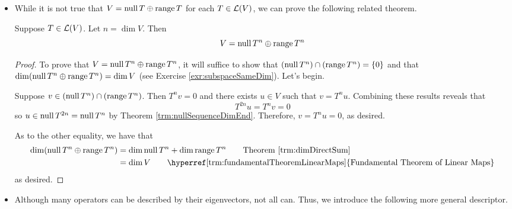 \documentclass[../main.tex]{subfiles}
\begin{document}
\begin{itemize}
\begin{theorem}
\begin{proof}
            At each of these strict inclusions, the dimension from the previous to the next null space must increase by at least one. Thus, $\dim\nul T^{n+1}\geq n+1$. But since $\nul T^{n+1}\subset V$, Theorem \ref{trm:dimSubspaces} asserts that $\dim\nul T^{n+1}\leq n$, so we have that
            \begin{equation*}
                n+1 \leq \dim\nul T^{n+1} \leq n
            \end{equation*}
            a contradiction.
        \end{proof}
    \end{theorem}
    \item While it is not true that $V=\operatorname{null} T\oplus\operatorname{range} T$ for each $T\in\mathcal{L}(V)$, we can prove the following related theorem.
    \begin{theorem}
        Suppose $T\in\mathcal{L}(V)$. Let $n=\dim V$. Then
        \begin{equation*}
            V = \operatorname{null} T^n\oplus\operatorname{range} T^n
        \end{equation*}
        \begin{proof}
            To prove that $V=\operatorname{null} T^n\oplus\operatorname{range} T^n$, it will suffice to show that $(\operatorname{null} T^n)\cap(\operatorname{range} T^n)=\{0\}$ and that $\dim(\operatorname{null} T^n\oplus\operatorname{range} T^n)=\dim V$ (see Exercise \ref{exr:subspaceSameDim}). Let's begin.\par
            Suppose $v\in(\operatorname{null} T^n)\cap(\operatorname{range} T^n)$. Then $T^nv=0$ and there exists $u\in V$ such that $v=T^nu$. Combining these results reveals that
            \begin{equation*}
                T^{2n}u = T^nv = 0
            \end{equation*}
            so $u\in\operatorname{null} T^{2n}=\operatorname{null} T^n$ by Theorem \ref{trm:nullSequenceDimEnd}. Therefore, $v=T^nu=0$, as desired.\par
            As to the other equality, we have that
            \begin{align*}
                \dim(\nul T^n\oplus\range T^n) &= \dim\nul T^n+\dim\range T^n\tag*{Theorem \ref{trm:dimDirectSum}}\\
                &= \dim V\tag*{\hyperref[trm:fundamentalTheoremLinearMaps]{Fundamental Theorem of Linear Maps}}
            \end{align*}
            as desired.
        \end{proof}
    \end{theorem}
    \item Although many operators can be described by their eigenvectors, not all can. Thus, we introduce the following more general descriptor.

\end{itemize}
\end{document}
